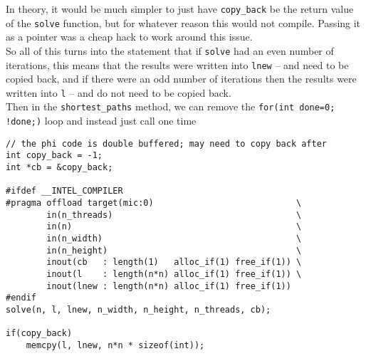 \documentclass[11pt]{article}
\begin{document}
\noindent In theory, it would be much simpler to just have \texttt{copy\_back} be the return value of the \texttt{solve} function, but for whatever reason this would not compile.  Passing it as a pointer was a cheap hack to work around this issue.\\

\noindent So all of this turns into the statement that if \texttt{solve} had an even number of iterations, this means that the results were written into \texttt{lnew} -- and need to be copied back, and if there were an odd number of iterations then the results were written into \texttt{l} -- and do not need to be copied back.\\

\noindent Then in the \texttt{shortest\_paths} method, we can remove the \texttt{for(int done=0; !done;)} loop and instead just call one time

\begin{lstlisting}
// the phi code is double buffered; may need to copy back after
int copy_back = -1;
int *cb = &copy_back;

#ifdef __INTEL_COMPILER
#pragma offload target(mic:0)                            \
        in(n_threads)                                    \
        in(n)                                            \
        in(n_width)                                      \
        in(n_height)                                     \
        inout(cb   : length(1)   alloc_if(1) free_if(1)) \
        inout(l    : length(n*n) alloc_if(1) free_if(1)) \
        inout(lnew : length(n*n) alloc_if(1) free_if(1))
#endif
solve(n, l, lnew, n_width, n_height, n_threads, cb);

if(copy_back)
    memcpy(l, lnew, n*n * sizeof(int));
\end{lstlisting}
\end{document}
